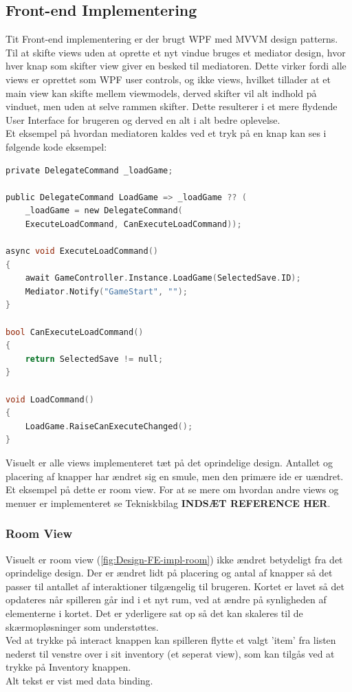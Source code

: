 \subsection{Front-end Implementering}
\label{Sec:FE-Implementering}
Tit Front-end implementering er der brugt WPF med MVVM design patterns.
Til at skifte views uden at oprette et nyt vindue bruges et mediator design, hvor hver knap som skifter view giver en besked til mediatoren. Dette virker fordi alle views er oprettet som WPF user controls, og ikke views, hvilket tillader at et main view kan skifte mellem viewmodels, derved skifter vil alt indhold på vinduet, men uden at selve rammen skifter. Dette resulterer i et mere flydende User Interface for brugeren og derved en alt i alt bedre oplevelse. \cite{Mediator}\\
Et eksempel på hvordan mediatoren kaldes ved et tryk på en knap kan ses i følgende kode eksempel:

\begin{lstlisting}[language=c]
private DelegateCommand _loadGame;
    
public DelegateCommand LoadGame => _loadGame ?? (
	_loadGame = new DelegateCommand(
	ExecuteLoadCommand, CanExecuteLoadCommand));

async void ExecuteLoadCommand()
{
    await GameController.Instance.LoadGame(SelectedSave.ID);
    Mediator.Notify("GameStart", "");
}

bool CanExecuteLoadCommand()
{
    return SelectedSave != null;
}

void LoadCommand()
{
    LoadGame.RaiseCanExecuteChanged();
}
\end{lstlisting}

Visuelt er alle views implementeret tæt på det oprindelige design. Antallet og placering af knapper har ændret sig en smule, men den primære ide er uændret. Et eksempel på dette er room view.
For at se mere om hvordan andre views og menuer er implementeret se Tekniskbilag \textbf{INDSÆT REFERENCE HER}.

\subsubsection{Room View}

Visuelt er room view (\autoref{fig:Design-FE-impl-room}) ikke ændret betydeligt fra det oprindelige design. Der er ændret lidt på placering og antal af knapper så det passer til antallet af interaktioner tilgængelig til brugeren. Kortet er lavet så det  opdateres når spilleren går ind i et nyt rum, ved at ændre på synligheden af elementerne i kortet. Det er yderligere sat op så det kan skaleres til de skærmopløsninger som understøttes.\\
Ved at trykke på interact knappen kan spilleren flytte et valgt 'item' fra listen nederst til venstre over i sit inventory (et seperat view), som kan tilgås ved at trykke på Inventory knappen.\\
Alt tekst er vist med data binding.

